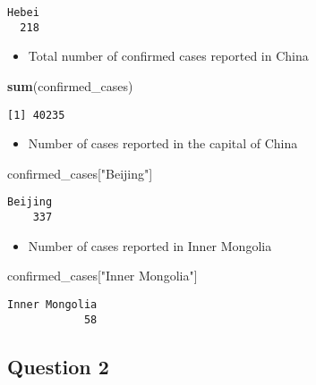 \documentclass[]{article}
\newenvironment{Shaded}{\begin{snugshade}}{\end{snugshade}}
\newcommand{\KeywordTok}[1]{\textcolor[rgb]{0.13,0.29,0.53}{\textbf{#1}}}
\newcommand{\NormalTok}[1]{#1}
\newcommand{\StringTok}[1]{\textcolor[rgb]{0.31,0.60,0.02}{#1}}
\providecommand{\tightlist}{%
  \setlength{\itemsep}{0pt}\setlength{\parskip}{0pt}}
\begin{document}
\begin{verbatim}
Hebei 
  218 
\end{verbatim}

\begin{itemize}
\tightlist
\item
  Total number of confirmed cases reported in China
\end{itemize}

\begin{Shaded}
\begin{Highlighting}[]
\KeywordTok{sum}\NormalTok{(confirmed_cases)}
\end{Highlighting}
\end{Shaded}

\begin{verbatim}
[1] 40235
\end{verbatim}

\begin{itemize}
\tightlist
\item
  Number of cases reported in the capital of China
\end{itemize}

\begin{Shaded}
\begin{Highlighting}[]
\NormalTok{confirmed_cases[}\StringTok{"Beijing"}\NormalTok{]}
\end{Highlighting}
\end{Shaded}

\begin{verbatim}
Beijing 
    337 
\end{verbatim}

\begin{itemize}
\tightlist
\item
  Number of cases reported in Inner Mongolia
\end{itemize}

\begin{Shaded}
\begin{Highlighting}[]
\NormalTok{confirmed_cases[}\StringTok{"Inner Mongolia"}\NormalTok{]}
\end{Highlighting}
\end{Shaded}

\begin{verbatim}
Inner Mongolia 
            58 
\end{verbatim}

\hypertarget{question-2}{%
\subsection{Question 2}\label{question-2}}
\end{document}
